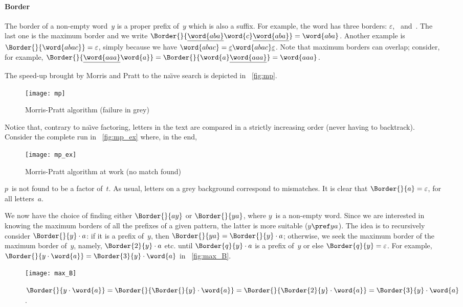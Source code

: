 \paragraph{Border}

The border of a non\hyp{}empty word~\(y\) is a proper prefix of~\(y\)
which is also a suffix. For example, the word  has three
borders: \(\varepsilon\), ~and~. The last one is the
maximum border and we write
\(\Border{}{\underline{\word{aba}}\word{c}\underline{\word{aba}}} =
\word{aba}\). Another example is \(\Border{}{\word{abac}} =
\varepsilon\), simply because we have \(\word{abac} =
\underline{\varepsilon}\word{abac}\underline{\varepsilon}\). Note that
maximum borders can overlap; consider, for example,
\(\Border{}{\underline{\word{aaa}}\word{a}} =
\Border{}{\word{a}\underline{\word{aaa}}} = \word{aaa}\).

The speed\hyp{}up brought by Morris and Pratt to the na\"{\i}ve search
is depicted in \fig~\vref{fig:mp}.
\begin{figure}[b]
\centering
\texttt{[image: mp]}
\caption{Morris-Pratt algorithm (failure in grey)}
\label{fig:mp}
\end{figure}
Notice that, contrary to na\"{\i}ve factoring, letters in the text are
compared in a strictly increasing order (never having to
backtrack). Consider the complete run in \fig~\vref{fig:mp_ex} where,
in the end,
\begin{figure}[t]
\centering
\texttt{[image: mp\_ex]}
\caption{Morris\hyp{}Pratt algorithm at work (no match found)}
\label{fig:mp_ex}
\end{figure}
\(p\)~is not found to be a factor of~\(t\). As usual, letters on a
grey background correspond to mismatches. It is clear that
\(\Border{}{a} = \varepsilon\), for all letters~\(a\).

We now have the choice of finding either \(\Border{}{ay}\) or
\(\Border{}{ya}\), where \(y\)~is a non\hyp{}empty word. Since we are
interested in knowing the maximum borders of all the prefixes of a
given pattern, the latter is more suitable (\(y \pref ya\)). The idea
is to recursively consider \(\Border{}{y} \cdot a\): if it is a prefix
of~\(y\), then \(\Border{}{ya} = \Border{}{y} \cdot a\); otherwise, we
seek the maximum border of the maximum border of~\(y\), namely,
\(\Border{2}{y} \cdot a\) etc. until \(\Border{q}{y} \cdot a\) is a
prefix of~\(y\) or else \(\Border{q}{y} = \varepsilon\). For example,
\(\Border{}{y \cdot \word{a}} = \Border{3}{y} \cdot \word{a}\) in
\fig~\vref{fig:max_B}.
\begin{figure}[b]
\centering
\texttt{[image: max\_B]}
\caption{\(\Border{}{y \cdot \word{a}}
   = \Border{}{\Border{}{y} \cdot \word{a}}
   = \Border{}{\Border{2}{y} \cdot \word{a}}
   = \Border{3}{y} \cdot \word{a}\).}
\label{fig:max_B}
\end{figure}

